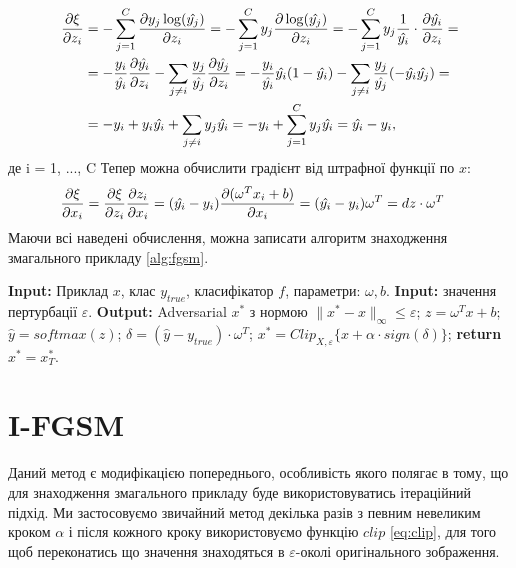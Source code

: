 \documentclass[a4paper,14pt]{extreport}
\renewcommand{\algorithmicrequire}{\textbf{Input: }}
\renewcommand{\algorithmicensure}{\textbf{Output: }}
\newcommand{\algorithmreturn}{\textbf{return }}
\newcommand{\tran}{^{T}}
\begin{document}
	\begin{align*}
		\pdv{\xi}{z_i} 
		&= 
		- \sum_{j=1}^{C} \pdv{ y_j \log (\hat{y_j})}{z_i} 
		=
		- \sum_{j=1}^{C} y_j \pdv{ \log (\hat{y_j})}{z_i} 
		= 
		- \sum_{j=1}^{C} y_j \frac{1}{\hat{y_i}} \cdot \pdv{\hat{y_i}}{z_i} 
		= \\& =
		- \frac{y_i}{\hat{y_i}} \pdv{\hat{y_i}}{z_i} - \sum_{j \neq i} \frac{y_j}{\hat{y_j}} \pdv{\hat{y_j}}{z_i} 
		= 
		-\frac{y_i}{\hat{y_i}} \hat{y_i} (1 - \hat{y_i}) - \sum_{j \neq i} \frac{y_j}{\hat{y_j}} (-\hat{y_i} \hat{y_j}) 
		= \\& =
		-y_i + y_i \hat{y_i} + \sum_{j \neq i} y_j \hat{y_i}
		= 
		-y_i + \sum_{j=1}^{C} y_j \hat{y_i} 
		=
		\hat{y_i} - y_i ,
	\end{align*}
	\endgroup
		де i = 1, ..., C
		\newline	
		Тепер можна обчислити градієнт від штрафної функції по $x$:
		\begin{align}
		\pdv{\xi}{x_i} 
		&=
		\pdv{\xi}{z_i} \pdv{z_i}{x_i} 
		=
		(\hat{y_i} - y_i) \pdv{(\omega\tran x_i+ b)}{x_i} 
		=
		(\hat{y_i} - y_i) \omega\tran 
		=
		dz \cdot \omega\tran
	\end{align}
	 Маючи всі наведені обчислення, можна записати алгоритм знаходження змагального прикладу \ref{alg:fgsm}.
	\begin{algorithm}
		\caption{$FGSM$}
		\label{alg:fgsm}
		\begin{algorithmic}[1]
			\State \algorithmicrequire{Приклад $x$, клас $y_{true}$, класифікатор $f$, параметри: $\omega, b$.}
			\State \algorithmicrequire{значення пертурбації $\varepsilon$.}
			\State \algorithmicensure{ Adversarial $x^{*}$ з нормою $\|x^{*} - x\|_{\infty} \leq \varepsilon $;}
			\State $z = \omega\tran x + b$;
			\State $\hat{y} = softmax(z)$;
			\State $\delta = (\hat{y} - y_{true}) \cdot \omega\tran$;
			\State $x^{*} = Clip_{X, \varepsilon} \big\{ x + \alpha \cdot sign( \delta ) \big\}$;
			\State \algorithmreturn{$x^{*} = x^{*}_{T}$}.
		\end{algorithmic}
	\end{algorithm}
	
	\section{I-FGSM}
	Даний метод є модифікацією попереднього, особливість якого полягає в тому, що для знаходження змагального прикладу буде використовуватись ітераційний підхід.	Ми застосовуємо звичайний метод декілька разів з певним невеликим кроком $\alpha$ і після кожного кроку використовуємо функцію $clip$ \ref{eq:clip}, для того щоб переконатись що значення знаходяться в $\varepsilon$-околі оригінального зображення.
	
\end{document}
